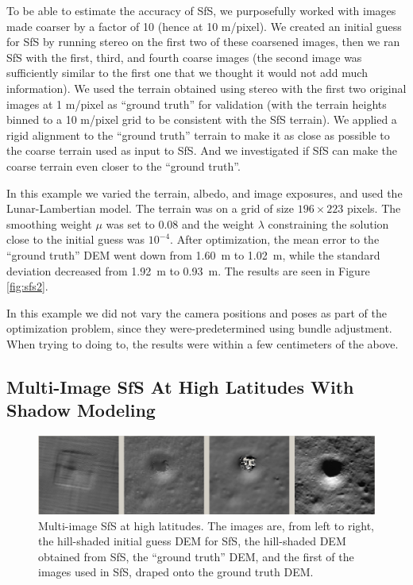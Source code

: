 \documentclass[12pt,oneside]{article}
\begin{document}
To be able to estimate the accuracy of SfS, we purposefully
worked with images made coarser by a factor of 10 (hence at 10
m/pixel). We created an initial guess for SfS by running stereo on
the first two of these coarsened images, then we ran SfS with the first,
third, and fourth coarse images (the second image was sufficiently
similar to the first one that we thought it would not add much
information). We used the terrain obtained using stereo with the first
two original images at 1 m/pixel as ``ground truth'' for
validation (with the terrain heights binned to a 10 m/pixel grid to be
consistent with the SfS terrain). We applied a rigid alignment to the
``ground truth'' terrain to make it as close as possible to the coarse
terrain used as input to SfS.  And we investigated if SfS can make the
coarse terrain even closer to the ``ground truth''.

In this example we varied the terrain, albedo, and image exposures, and
used the Lunar-Lambertian model.  The terrain was on a grid of size
$196\times 223$ pixels. The smoothing weight $\mu$ was set to 0.08 and
the weight $\lambda$ constraining the solution close to the initial
guess was $10^{-4}$. After optimization, the mean error to the ``ground truth'' DEM went
down from 1.60~m to 1.02~m, while the standard deviation
decreased from 1.92~m to 0.93~m. The results are seen in Figure \ref{fig:sfs2}.

In this example we did not vary the camera positions and poses as part
of the optimization problem, since they were-predetermined using bundle adjustment. When trying
to doing to, the results were within a few centimeters of the above. 

\subsection{Multi-Image SfS At High Latitudes With Shadow Modeling}

\begin{figure}[h!]
\begin{center}
\includegraphics[width=6in]{figures/sfs3.jpg}
\caption[sfs]{Multi-image SfS at high latitudes. The images are, from
  left to right, the hill-shaded initial guess DEM for SfS, the hill-shaded DEM obtained
from SfS, the ``ground truth'' DEM, and the first of the
images used in SfS, draped onto the ground truth DEM.}
\label{fig:sfs3}
\end{center}
\end{figure}
\end{document}
